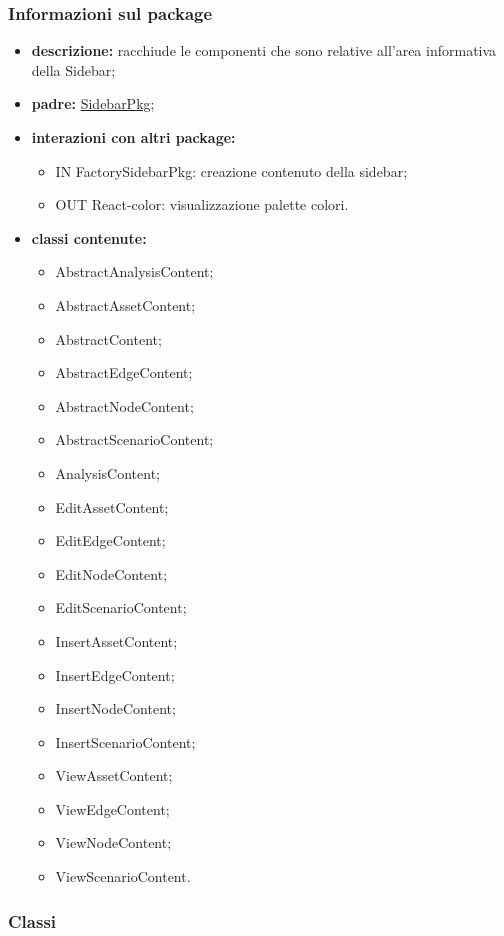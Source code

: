 \subsubsection{Informazioni sul package}
\begin{itemize}
	\item \textbf{descrizione:} racchiude le componenti che sono relative all'area informativa della Sidebar;
	\item \textbf{padre:} \hyperref[pkg::SidebarPkg]{SidebarPkg};
	\item \textbf{interazioni con altri package:} 
	\begin{itemize}
		\item IN FactorySidebarPkg: creazione contenuto della sidebar;
		\item OUT React-color: visualizzazione palette colori.
	\end{itemize}
	\item \textbf{classi contenute:}
	\begin{itemize}
		\item AbstractAnalysisContent;
		\item AbstractAssetContent;
		\item AbstractContent;
		\item AbstractEdgeContent;
		\item AbstractNodeContent;
		\item AbstractScenarioContent;
		\item AnalysisContent;
		\item EditAssetContent;
		\item EditEdgeContent;
		\item EditNodeContent;
		\item EditScenarioContent;
		\item InsertAssetContent;
		\item InsertEdgeContent;
		\item InsertNodeContent;
		\item InsertScenarioContent;
		\item ViewAssetContent;
		\item ViewEdgeContent;
		\item ViewNodeContent;
		\item ViewScenarioContent.
	\end{itemize}
\end{itemize}
\subsubsection{Classi}
